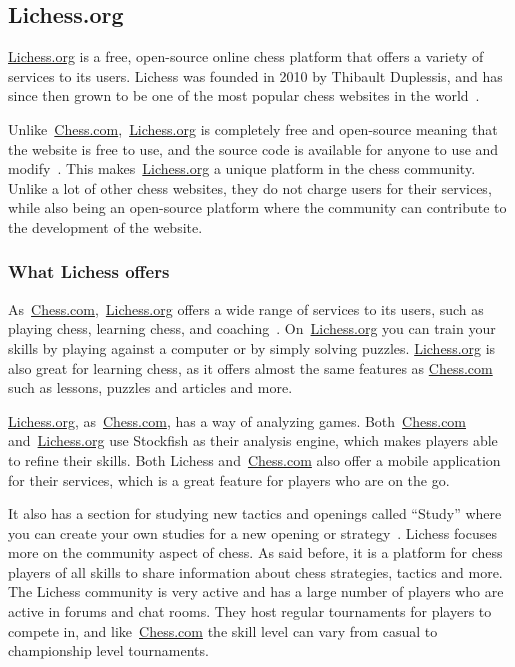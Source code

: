 \subsection{Lichess.org}\label{subsec:lichess-org}

\url{Lichess.org} is a free, open-source online chess platform that offers a variety of services to its users.
Lichess was founded in 2010 by Thibault Duplessis, and has since then grown to be one of the most popular chess websites
in the world~\cite{about-lichess}.

Unlike~\url{Chess.com},~\url{Lichess.org} is completely free and open-source meaning that the website is free to use,
and the source
code is available for anyone to use and modify~\cite{Lichess-Github}.
This makes~\url{Lichess.org} a unique platform in the chess community.
Unlike a lot of other chess websites, they do not charge users for their services, while also being an open-source
platform where the community can contribute to the development of the website.

\subsubsection{What Lichess offers}\label{subsubsec:what-does-lichess-offer}

As~\url{Chess.com},~\url{Lichess.org} offers a wide range of services to its users, such as playing chess,
learning chess, and coaching~\cite{about-lichess}.
On~\url{Lichess.org} you can train your skills by playing against a computer or by simply solving puzzles.
\url{Lichess.org} is also great for learning chess, as it offers almost the same features as \url{Chess.com}
such as lessons, puzzles and articles and more.

\url{Lichess.org}, as~\url{Chess.com}, has a way of analyzing games.
Both~\url{Chess.com} and~\url{Lichess.org} use Stockfish as their analysis engine, which makes players able to
refine their skills.
Both Lichess and~\url{Chess.com} also offer a mobile application for their services, which is a great feature for
players who are on the go.

It also has a section for studying new tactics and openings called “Study” where you can create your own studies for
a new opening or strategy~\cite{Lichess.org}.
Lichess focuses more on the community aspect of chess.
As said before, it is a platform for chess players of all skills to share information about chess strategies,
tactics and more.
The Lichess community is very active and has a large number of players who are active in forums and chat rooms.
They host regular tournaments for players to compete in, and like~\url{Chess.com} the skill level can vary
from casual to championship level tournaments.
